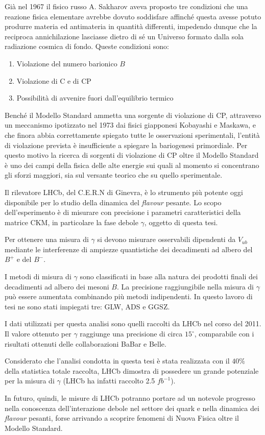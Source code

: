 Già nel 1967 il fisico russo A. Sakharov aveva proposto tre condizioni che una reazione fisica elementare avrebbe dovuto soddisfare affinché questa avesse potuto produrre materia ed antimateria in quantità differenti, impedendo dunque che la reciproca annichilazione lasciasse dietro di sé un Universo formato dalla sola radiazione cosmica di fondo. Queste condizioni sono:
\begin{enumerate}
 \item Violazione del numero barionico $B$
 \item Violazione di C e di CP
 \item Possibilità di avvenire fuori dall'equilibrio termico
\end{enumerate}
Benché il Modello Standard ammetta una sorgente di violazione di CP, attraverso un meccanismo ipotizzato nel 1973 dai fisici 
giapponesi Kobayashi e Maskawa, e che finora abbia correttamente spiegato tutte le osservazioni sperimentali, l'entità di violazione prevista è insufficiente 
a spiegare la bariogenesi primordiale. Per questo motivo la ricerca di sorgenti di violazione di CP oltre il Modello Standard è uno dei campi della fisica delle 
alte energie sui quali al momento si concentrano gli sforzi maggiori, sia sul versante teorico che su quello sperimentale. 

Il rilevatore LHCb, del C.E.R.N di Ginevra, è lo strumento più potente oggi disponibile per lo studio della dinamica del \emph{flavour} pesante. 
Lo scopo dell'esperimento è di misurare con precisione i parametri caratteristici della matrice CKM, in particolare la fase debole $\gamma$, oggetto di questa tesi.

Per ottenere una misura di $\gamma$ si devono misurare osservabili dipendenti da $V_{ub}$ mediante le interferenze di ampiezze quantistiche dei decadimenti ad 
albero del $B^+$ e del $B^-$.

I metodi di misura di $\gamma$ sono classificati in base alla natura dei prodotti finali dei decadimenti ad albero dei mesoni $B$. 
La precisione raggiungibile nella misura di $\gamma$ può essere aumentata combinando più metodi indipendenti.
In questo lavoro di tesi ne sono stati impiegati tre: GLW, ADS e GGSZ.

I dati utilizzati per questa analisi sono quelli raccolti da LHCb nel corso del 2011. Il valore ottenuto per $\gamma$ 
raggiunge una precisione di circa $15^{\circ}$, comparabile con i risultati ottenuti
delle collaborazioni BaBar e Belle.

Considerato che l'analisi condotta in questa tesi è stata realizzata con il $40\%$ 
della statistica totale raccolta, LHCb dimostra di possedere un grande potenziale per la misura di $\gamma$ (LHCb ha infatti raccolto 2.5 $fb^{-1}$).

In futuro, quindi, le misure di LHCb potranno portare ad un notevole progresso nella conoscenza dell'interazione debole nel settore dei quark e nella dinamica dei 
\emph{flavour} pesanti, forse arrivando a scoprire fenomeni di Nuova Fisica oltre il Modello Standard.

